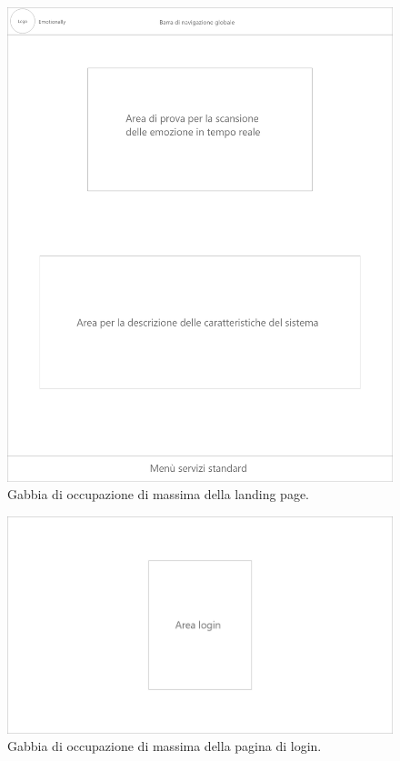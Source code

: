 \begin{figure}[H]
	\centering
	\caption{Gabbia di occupazione di massima della landing page.}
	\label{fig:gabbie-massima:landing-page}
	\includegraphics[width=\textwidth]{images/gabbie-di-massima/Landing}
\end{figure}

\begin{figure}[H]
	\centering
	\caption{Gabbia di occupazione di massima della pagina di login.}
	\label{fig:gabbie-massima:login}
	\includegraphics[width=\textwidth]{images/gabbie-di-massima/Login}
\end{figure}


